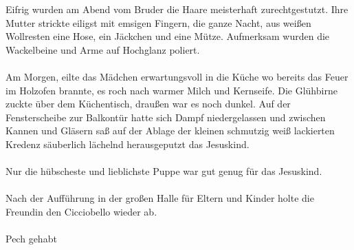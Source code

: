 Eifrig wurden am Abend vom Bruder die Haare meisterhaft zurechtgestutzt. Ihre Mutter strickte eiligst mit emsigen Fingern, die ganze Nacht, aus weißen Wollresten eine Hose, ein Jäckchen und eine Mütze. Aufmerksam wurden die Wackelbeine und Arme auf Hochglanz poliert. \\\\
Am Morgen, eilte das Mädchen erwartungsvoll in die Küche wo bereits das Feuer im Holzofen brannte, es roch nach warmer Milch und Kernseife. Die Glühbirne zuckte über dem Küchentisch, draußen war es noch dunkel. Auf der Fensterscheibe zur Balkontür hatte sich Dampf niedergelassen und zwischen Kannen und Gläsern saß auf der Ablage der kleinen schmutzig weiß lackierten Kredenz säuberlich lächelnd herausgeputzt das Jesuskind. \\\\
Nur die hübscheste und lieblichste Puppe war gut genug für das Jesuskind.\\\\
Nach der Aufführung in der großen Halle für Eltern und Kinder holte die Freundin den Cicciobello wieder ab.\\\\
Pech gehabt